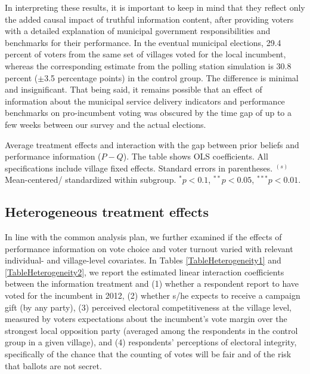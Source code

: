\documentclass[11pt]{article}
\begin{document}
In interpreting these results, it is important to keep in mind that they reflect only the added causal impact of truthful information content, after providing voters with a detailed explanation of municipal government responsibilities and benchmarks for their performance. In the eventual municipal elections, 29.4 percent of voters from the same set of villages voted for the local incumbent, whereas the corresponding estimate from the polling station simulation is 30.8 percent ($\pm$3.5 percentage points) in the control group. The difference is minimal and insignificant. That being said, it remains possible that an effect of information about the municipal service delivery indicators and performance benchmarks on pro-incumbent voting was obscured by the time gap of up to a few weeks between our survey and the actual elections. 

\begin{table}

\caption{Average treatment effects and interaction with the gap between prior beliefs and performance information ($P-Q$). The table shows OLS coefficients. All specifications include village fixed effects. Standard errors in parentheses. $^{(s)}$ Mean-centered/ standardized within subgroup. $^{*} p<0.1$, $^{**} p<0.05$, $^{***} p<0.01$. }
\end{table}

\subsection{Heterogeneous treatment effects}

In line with the common analysis plan, we further examined if the effects of performance information on vote choice and voter turnout varied with relevant individual- and village-level covariates. In Tables \ref{TableHeterogeneity1} and \ref{TableHeterogeneity2}, we report the estimated linear interaction coefficients between the information treatment and (1) whether a respondent report to have voted for the incumbent in 2012, (2) whether s/he expects to receive a campaign gift (by any party), (3) perceived electoral competitiveness at the village level, measured by voters expectations about the incumbent's vote margin over the strongest local opposition party (averaged among the respondents in the control group in a given village), and (4) respondents' perceptions of electoral integrity, specifically of the chance that the counting of votes will be fair and of the risk that ballots are not secret. 
\end{document}
